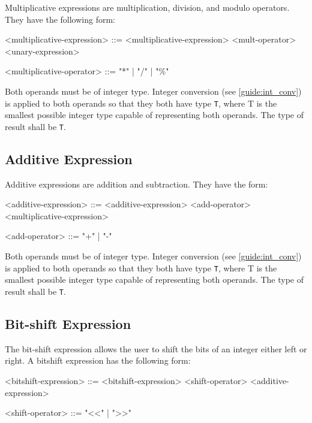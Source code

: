 Multiplicative expressions are multiplication, division, and modulo operators. They have the following form:

\begin{minip}
\begin{grammar}
<multiplicative-expression> ::= <multiplicative-expression> 
<mult-operator> <unary-expression>

<multiplicative-operator> ::= "*" | "/" | "\%"
\end{grammar}
\end{minip}

Both operands must be of integer type. Integer conversion (see \ref{guide:int_conv}) is applied to both operands so that they both have type \texttt{T}, where T is the smallest possible integer type capable of representing both operands. The type of result shall be \texttt{T}. 

\subsection{Additive Expression} \label{guide:add_expr}

Additive expressions are addition and subtraction. They have the form: 

\begin{minip}
\begin{grammar}
<additive-expression> ::= <additive-expression> 
<add-operator> <multiplicative-expression>

<add-operator> ::= "+" | "-"
\end{grammar}
\end{minip}

Both operands must be of integer type. Integer conversion (see \ref{guide:int_conv}) is applied to both operands so that they both have type \texttt{T}, where T is the smallest possible integer type capable of representing both operands. The type of result shall be \texttt{T}.

\subsection{Bit-shift Expression} \label{guide:bitshift_expr}

The bit-shift expression allows the user to shift the bits of an integer either left or right. A bitshift expression has the following form:

\begin{minip}
\begin{grammar}
<bitshift-expression> ::= <bitshift-expression> 
<shift-operator> <additive-expression>

<shift-operator> ::= "<<" | ">>"
\end{grammar}
\end{minip}

